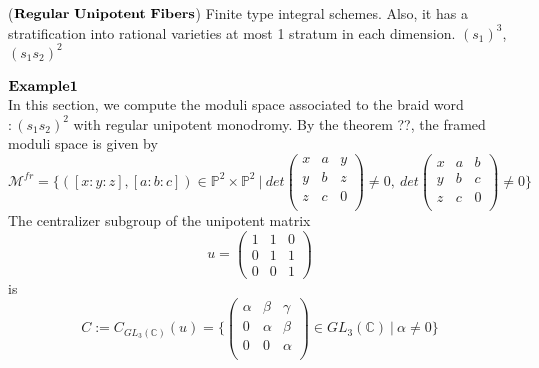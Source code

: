 \begin{example}
($\bf{Regular~Unipotent~Fibers}$) Finite type integral schemes. Also, it has a stratification into rational varieties at most 1 stratum in each dimension. $(s_1)^3$, $(s_1 s_2)^2$\\
\\
$\bf{Example1}$\\
In this section, we compute the moduli space associated to the braid word $:(s_1s_2)^2$ with regular unipotent monodromy. By the theorem ??, the framed moduli space is given by
\[
	\mathcal{M}^{fr}=\{
	([x:y:z],[a:b:c])\in \mathbb{P}^2 \times \mathbb{P}^2~|~
	det	
	\begin{pmatrix}
	x&a&y\\
	y&b&z\\
	z&c&0\\
	\end{pmatrix}
	\neq 0,~
	det	
	\begin{pmatrix}
	x&a&b\\
	y&b&c\\
	z&c&0\\
	\end{pmatrix}
	\neq 0	 	
	\}
\]
The centralizer subgroup of the unipotent matrix
\[u=
	\begin{pmatrix}
		1&1&0\\
		0&1&1\\
		0&0&1
	\end{pmatrix}
\] 
is
\[
	C:=C_{GL_3(\mathbb{C})}(u)=
	\{
	\begin{pmatrix}
	\alpha&\beta&\gamma\\
	0&\alpha&\beta\\
	0&0&\alpha\\
	\end{pmatrix}
	\in GL_3(\mathbb{C})~|~
	\alpha \neq 0
	\}
\]


\end{example}
